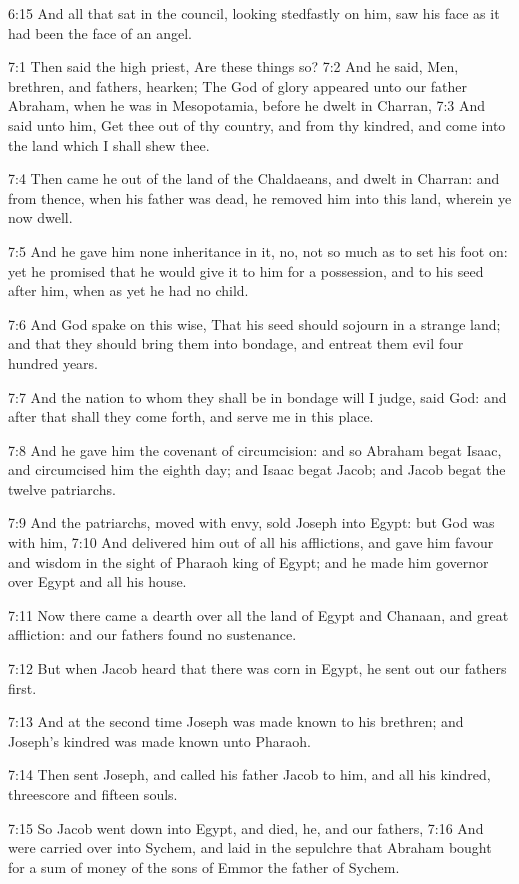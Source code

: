 6:15 And all that sat in the council, looking stedfastly on him, saw
his face as it had been the face of an angel.

7:1 Then said the high priest, Are these things so?  7:2 And he said,
Men, brethren, and fathers, hearken; The God of glory appeared unto
our father Abraham, when he was in Mesopotamia, before he dwelt in
Charran, 7:3 And said unto him, Get thee out of thy country, and from
thy kindred, and come into the land which I shall shew thee.

7:4 Then came he out of the land of the Chaldaeans, and dwelt in
Charran: and from thence, when his father was dead, he removed him
into this land, wherein ye now dwell.

7:5 And he gave him none inheritance in it, no, not so much as to set
his foot on: yet he promised that he would give it to him for a
possession, and to his seed after him, when as yet he had no child.

7:6 And God spake on this wise, That his seed should sojourn in a
strange land; and that they should bring them into bondage, and
entreat them evil four hundred years.

7:7 And the nation to whom they shall be in bondage will I judge, said
God: and after that shall they come forth, and serve me in this place.

7:8 And he gave him the covenant of circumcision: and so Abraham begat
Isaac, and circumcised him the eighth day; and Isaac begat Jacob; and
Jacob begat the twelve patriarchs.

7:9 And the patriarchs, moved with envy, sold Joseph into Egypt: but
God was with him, 7:10 And delivered him out of all his afflictions,
and gave him favour and wisdom in the sight of Pharaoh king of Egypt;
and he made him governor over Egypt and all his house.

7:11 Now there came a dearth over all the land of Egypt and Chanaan,
and great affliction: and our fathers found no sustenance.

7:12 But when Jacob heard that there was corn in Egypt, he sent out
our fathers first.

7:13 And at the second time Joseph was made known to his brethren; and
Joseph's kindred was made known unto Pharaoh.

7:14 Then sent Joseph, and called his father Jacob to him, and all his
kindred, threescore and fifteen souls.

7:15 So Jacob went down into Egypt, and died, he, and our fathers,
7:16 And were carried over into Sychem, and laid in the sepulchre that
Abraham bought for a sum of money of the sons of Emmor the father of
Sychem.

